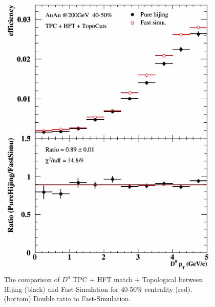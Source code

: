 \documentclass[a4paper]{article}
\begin{document}
\begin{figure}[htbp]
\begin{minipage}[htbp]{0.47\linewidth}
\includegraphics[width=1.0\textwidth,angle=0]{fig/40_50.png} 
\caption{ The comparison of $D^0$ TPC + HFT match + Topological between Hijing (black) and Fast-Simulation for 40-50\% centrality (red). (bottom) Double ratio to Fast-Simulation.\label{40_50}}
\end{minipage}
\end{figure}
\end{document}
